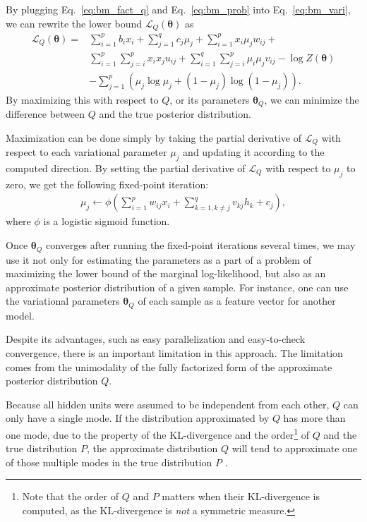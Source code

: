 \documentclass[dissertation,nocontribution,draft*]{aaltoseries}
\newcommand{\vects}[1]{\boldsymbol{#1}}
\newcommand{\TT}[0]{{\vects{\theta}}}
\newcommand{\LL}[0]{\mathcal{L}}
\begin{document}
By plugging Eq.~\eqref{eq:bm_fact_q} and
Eq.~\eqref{eq:bm_prob} into Eq.~\eqref{eq:bm_vari}, we can
rewrite the lower bound $\LL_Q(\TT)$ as
\begin{align}
    \label{eq:bm_lowerbound}
    \LL_Q(\TT) =& \sum_{i=1}^p b_i x_i + \sum_{j=1}^q c_j
    \mu_j + \sum_{i=1}^p x_i \mu_j w_{ij} + 
    \nonumber \\ 
    & \sum_{i=1}^p \sum_{j=i}^p x_i x_j u_{ij} +
    \sum_{i=1}^q \sum_{j=i}^p \mu_i \mu_j v_{ij} -\log
    Z(\TT) 
    \nonumber \\
    & - \sum_{j=1}^p \left( \mu_j \log \mu_j + (1
    - \mu_j) \log (1 - \mu_j)
    \right).
\end{align}
By maximizing this with respect to $Q$, or its
parameters $\TT_Q$, we can minimize the difference between
$Q$ and the true posterior distribution. 

Maximization can be done simply by taking the
partial derivative of $\LL_Q$ with respect to each variational
parameter $\mu_j$ and updating it according to the computed
direction. By setting the partial derivative of $\LL_Q$ with
respect to $\mu_j$ to zero, we get the following fixed-point
iteration:
\begin{align}
    \label{eq:vari_update}
    \mu_j \leftarrow \phi\left(\sum_{i=1}^p w_{ij} x_i +
    \sum_{k=1, k\neq j}^q v_{kj} h_k + c_j\right),
\end{align}
where $\phi$ is a logistic sigmoid function.

Once $\TT_Q$ converges after running the fixed-point
iterations several times, we may use it not only for
estimating the parameters as a part of a problem of
maximizing the lower bound of the marginal log-likelihood,
but also as an approximate posterior distribution of a given
sample. For instance, one can use the variational parameters
$\TT_Q$ of each sample as a feature vector for another
model.

Despite its advantages, such as easy parallelization and
easy-to-check convergence, there is an important limitation
in this approach. The limitation comes from the unimodality
of the fully factorized form of the approximate posterior
distribution $Q$.

Because all hidden units were assumed to be independent from
each other, $Q$ can only have a single mode. If the
distribution approximated by $Q$ has more than one mode,
due to the property of the KL-divergence and the
order\footnote{Note that the order of $Q$ and $P$ matters
when their KL-divergence is computed, as the KL-divergence
is \textit{not} a symmetric measure.} of $Q$ and the true
distribution $P$, the approximate distribution $Q$ will tend
to approximate one of those multiple modes in the true
distribution $P$ \citep[see][Section 21.2.2 for more details]{Murphy2012}.
\end{document}
